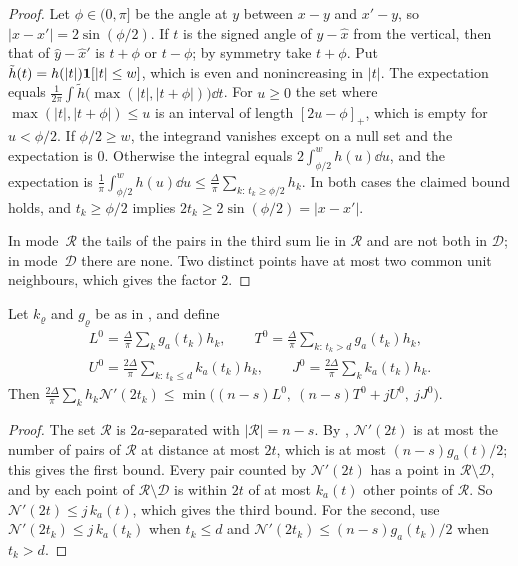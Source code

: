 \documentclass[11pt,colorlinks]{charlie}
\newcommand{\cR}{\mathcal{R}}
\newcommand{\cD}{\mathcal{D}}
\newcommand{\pos}[1]{\left[#1\right]_+}
\begin{document}
\begin{proof}
Let $\phi\in(0,\pi]$ be the angle at $y$ between $x-y$ and $x'-y$, so $|x-x'|=2\sin(\phi/2)$. If $t$ is the signed angle of $\hat y-\hat x$ from the vertical, then that of $\hat y-\hat x'$ is $t+\phi$ or $t-\phi$; by symmetry take $t+\phi$. Put $\tilde h(t)=h(|t|)\mathbf{1}[|t|\le w]$, which is even and nonincreasing in $|t|$. The expectation equals $\frac{1}{2\pi}\int\tilde h\big(\max(|t|,|t+\phi|)\big)\dd t$. For $u\ge0$ the set where $\max(|t|,|t+\phi|)\le u$ is an interval of length $\pos{2u-\phi}$, which is empty for $u<\phi/2$. If $\phi/2\ge w$, the integrand vanishes except on a null set and the expectation is $0$. Otherwise the integral equals $2\int_{\phi/2}^wh(u)\dd u$, and the expectation is $\frac1\pi\int_{\phi/2}^wh(u)\dd u\le\frac{\Delta}{\pi}\sum_{k:\,t_k\ge\phi/2}h_k$. In both cases the claimed bound holds, and $t_k\ge\phi/2$ implies $2t_k\ge2\sin(\phi/2)=|x-x'|$.

In mode~$\cR$ the tails of the pairs in the third sum lie in $\cR$ and are not both in $\cD$; in mode~$\cD$ there are none. Two distinct points have at most two common unit neighbours, which gives the factor $2$.
\end{proof}

\begin{lemma}\label{lem:collision-modes}
Let $k_\varrho$ and $g_\varrho$ be as in , and define
\begin{gather*}
 L^0=\frac{\Delta}{\pi}\sum_kg_a(t_k)h_k,\qquad T^0=\frac{\Delta}{\pi}\sum_{k:\,t_k>d}g_a(t_k)h_k,\\
 U^0=\frac{2\Delta}{\pi}\sum_{k:\,t_k\le d}k_a(t_k)h_k,\qquad J^0=\frac{2\Delta}{\pi}\sum_kk_a(t_k)h_k .
\end{gather*}
Then $\frac{2\Delta}\pi\sum_kh_k\mathcal N'(2t_k)\le\min\big((n-s)L^0,\ (n-s)T^0+jU^0,\ jJ^0\big)$.
\end{lemma}

\begin{proof}
The set $\cR$ is $2a$-separated with $|\cR|=n-s$. By , $\mathcal N'(2t)$ is at most the number of pairs of $\cR$ at distance at most $2t$, which is at most $(n-s)g_a(t)/2$; this gives the first bound. Every pair counted by $\mathcal N'(2t)$ has a point in $\cR\setminus\cD$, and by  each point of $\cR\setminus\cD$ is within $2t$ of at most $k_a(t)$ other points of $\cR$. So $\mathcal N'(2t)\le j\,k_a(t)$, which gives the third bound. For the second, use $\mathcal N'(2t_k)\le j\,k_a(t_k)$ when $t_k\le d$ and $\mathcal N'(2t_k)\le(n-s)g_a(t_k)/2$ when $t_k>d$.
\end{proof}
\end{document}
